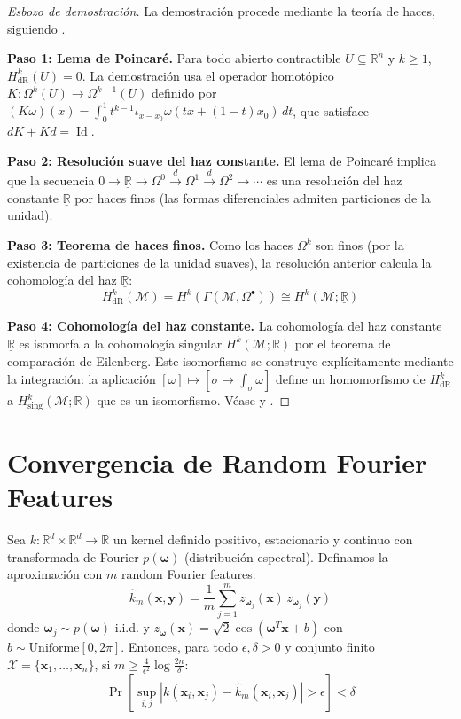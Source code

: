 \begin{proof}[Esbozo de demostración]
La demostración procede mediante la teoría de haces, siguiendo \citep{Warner1983}.

\textbf{Paso 1: Lema de Poincaré.} Para todo abierto contractible $U \subseteq \mathbb{R}^n$ y $k \geq 1$, $H^k_{\text{dR}}(U) = 0$. La demostración usa el operador homotópico $K: \Omega^k(U) \to \Omega^{k-1}(U)$ definido por $(K\omega)(x) = \int_0^1 t^{k-1} \iota_{x-x_0} \omega(tx+(1-t)x_0) \, dt$, que satisface $dK + Kd = \operatorname{Id}$.

\textbf{Paso 2: Resolución suave del haz constante.} El lema de Poincaré implica que la secuencia $0 \to \underline{\mathbb{R}} \to \Omega^0 \xrightarrow{d} \Omega^1 \xrightarrow{d} \Omega^2 \to \cdots$ es una resolución del haz constante $\underline{\mathbb{R}}$ por haces finos (las formas diferenciales admiten particiones de la unidad).

\textbf{Paso 3: Teorema de haces finos.} Como los haces $\Omega^k$ son finos (por la existencia de particiones de la unidad suaves), la resolución anterior calcula la cohomología del haz $\underline{\mathbb{R}}$:
\[
H^k_{\text{dR}}(\mathcal{M}) = H^k(\Gamma(\mathcal{M}, \Omega^\bullet)) \cong H^k(\mathcal{M}; \underline{\mathbb{R}})
\]

\textbf{Paso 4: Cohomología del haz constante.} La cohomología del haz constante $\underline{\mathbb{R}}$ es isomorfa a la cohomología singular $H^k(\mathcal{M}; \mathbb{R})$ por el teorema de comparación de Eilenberg. Este isomorfismo se construye explícitamente mediante la integración: la aplicación $[\omega] \mapsto [\sigma \mapsto \int_\sigma \omega]$ define un homomorfismo de $H^k_{\text{dR}}$ a $H^k_{\text{sing}}(\mathcal{M}; \mathbb{R})$ que es un isomorfismo. Véase \citep[Capítulo~5]{Warner1983} y \citep[Capítulo~17]{Lee2013}.
\end{proof}

\section{Convergencia de Random Fourier Features}\label{sec:convergencia_rff}

\begin{theorem}\label{thm:convergencia_rff_apendice}
Sea $k: \mathbb{R}^d \times \mathbb{R}^d \to \mathbb{R}$ un kernel definido positivo, estacionario y continuo con transformada de Fourier $p(\boldsymbol{\omega})$ (distribución espectral). Definamos la aproximación con $m$ random Fourier features:
\[
\hat{k}_m(\mathbf{x}, \mathbf{y}) = \frac{1}{m} \sum_{j=1}^{m} z_{\boldsymbol{\omega}_j}(\mathbf{x}) \, z_{\boldsymbol{\omega}_j}(\mathbf{y})
\]
donde $\boldsymbol{\omega}_j \sim p(\boldsymbol{\omega})$ i.i.d. y $z_{\boldsymbol{\omega}}(\mathbf{x}) = \sqrt{2}\cos(\boldsymbol{\omega}^T \mathbf{x} + b)$ con $b \sim \text{Uniforme}[0, 2\pi]$. Entonces, para todo $\epsilon, \delta > 0$ y conjunto finito $\mathcal{X} = \{\mathbf{x}_1, \ldots, \mathbf{x}_n\}$, si $m \geq \frac{4}{\epsilon^2}\log\frac{2n}{\delta}$:
\[
\Pr\!\left[\sup_{i,j} |k(\mathbf{x}_i, \mathbf{x}_j) - \hat{k}_m(\mathbf{x}_i, \mathbf{x}_j)| > \epsilon\right] < \delta
\]
\end{theorem}

